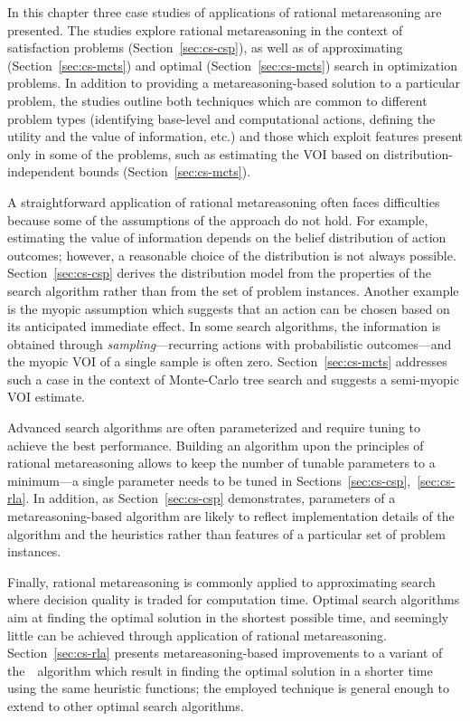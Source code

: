 In this chapter three case studies of applications of rational
metareasoning are presented. The studies explore rational
metareasoning in the context of satisfaction problems
(Section~\ref{sec:cs-csp}), as well as of approximating
(Section~\ref{sec:cs-mcts}) and optimal (Section~\ref{sec:cs-mcts})
search in optimization problems. In addition to providing a
metareasoning-based solution to a particular problem, the studies
outline both techniques which are common to different problem types
(identifying base-level and computational actions, 
defining the utility and the value of information, etc.)
and those which exploit features present only in some of the problems,
such as estimating the VOI based on distribution-independent bounds
(Section~\ref{sec:cs-mcts}). 

A straightforward application of rational metareasoning often faces
difficulties because some of the assumptions of the approach do not
hold. For example, estimating the value of information depends on
the belief distribution of action outcomes; however, a reasonable choice
of the distribution is not always possible. Section~\ref{sec:cs-csp}
derives the distribution model from the properties of the search
algorithm rather than from the set of problem instances. Another
example is the myopic assumption \cite{Russell.right} which suggests
that an action can be chosen based on its anticipated immediate
effect. In some search algorithms, the information is obtained through
\emph{sampling}---recurring actions with probabilistic outcomes---and
the myopic VOI of a single sample is often
zero. Section~\ref{sec:cs-mcts} addresses such a case in the context
of Monte-Carlo tree search and suggests a semi-myopic VOI estimate.

Advanced search algorithms are often parameterized and require tuning
to achieve the best performance. Building an algorithm upon the
principles of rational metareasoning allows to keep the number of
tunable parameters to a minimum---a single parameter needs to be tuned
in Sections~\ref{sec:cs-csp},~\ref{sec:cs-rla}. In addition, as
Section~\ref{sec:cs-csp} demonstrates, parameters
of a metareasoning-based algorithm are likely to reflect
implementation details of the algorithm and the heuristics rather
than features of a particular set of problem instances.

Finally, rational metareasoning is commonly applied to approximating
search where decision quality is traded for computation time. Optimal
search algorithms aim at finding the optimal solution in the shortest
possible time, and seemingly little can be achieved through
application of rational metareasoning.  Section~\ref{sec:cs-rla}
presents metareasoning-based improvements to a variant of
the~\astar~algorithm which result in finding the optimal solution in a
shorter time using the same heuristic functions; the employed
technique is general enough to extend to other optimal
search algorithms.


